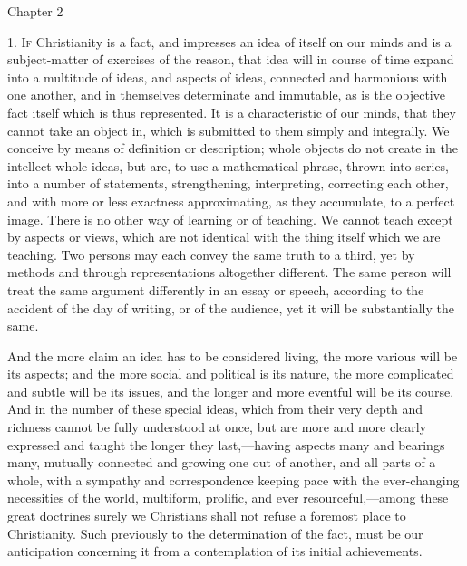 Chapter 2



1. I\textsc{f} Christianity is a fact, and impresses an idea of
itself on our minds and is a subject-matter of exercises
of the reason, that idea will in course of time expand
into a multitude of ideas, and aspects of ideas,
connected and harmonious with one another, and in
themselves determinate and immutable, as is the objective
fact itself which is thus represented. It is a
characteristic of our minds, that they cannot take an
object in, which is submitted to them simply and
integrally. We conceive by means of definition or
description; whole objects do not create in the intellect
whole ideas, but are, to use a mathematical phrase,
thrown into series, into a number of statements,
strengthening, interpreting, correcting each other, and
with more or less exactness approximating, as they
accumulate, to a perfect image. There is no other way of
learning or of teaching. We cannot teach except by
aspects or views, which are not identical with the thing
itself which we are teaching. Two persons may each convey
the same truth to a third, yet by methods and through
representations altogether different. The same person
will treat the same argument differently in an essay or
speech, according to the accident of the day of writing,
or of the audience, yet it will be substantially the
same.

And the more claim an idea has to be considered
living, the more various will be its aspects; and the
more social and political is its nature, the more
complicated and subtle will be its issues, and the longer
and more eventful will be its course. And in the number
of these special ideas, which from their very depth and
richness cannot be fully understood at once, but are more
and more clearly expressed and taught the longer they
last,—having aspects many and bearings many,
mutually connected and growing one out of another, and
all parts of a whole, with a sympathy and correspondence
keeping pace with the ever-changing necessities of the
world, multiform, prolific, and ever
resourceful,—among these great doctrines surely we
Christians shall not refuse a foremost place to
Christianity. Such previously to the determination of the
fact, must be our anticipation concerning it from a
contemplation of its initial achievements.

